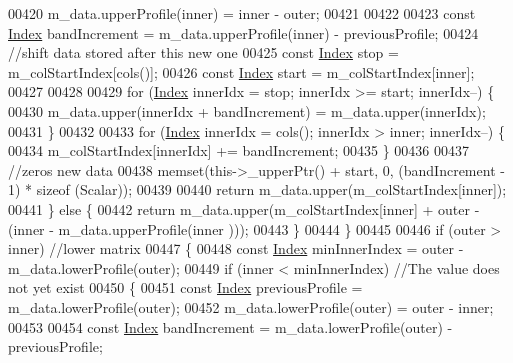 \begin{DoxyCode}
00420                     m\_data.upperProfile(inner) = inner - outer;
00421 
00422 
00423                     \textcolor{keyword}{const} \hyperlink{group___core___module_a554f30542cc2316add4b1ea0a492ff02}{Index} bandIncrement = m\_data.upperProfile(inner) - previousProfile;
00424                     \textcolor{comment}{//shift data stored after this new one}
00425                     \textcolor{keyword}{const} \hyperlink{group___core___module_a554f30542cc2316add4b1ea0a492ff02}{Index} stop = m\_colStartIndex[cols()];
00426                     \textcolor{keyword}{const} \hyperlink{group___core___module_a554f30542cc2316add4b1ea0a492ff02}{Index} start = m\_colStartIndex[inner];
00427 
00428 
00429                     \textcolor{keywordflow}{for} (\hyperlink{group___core___module_a554f30542cc2316add4b1ea0a492ff02}{Index} innerIdx = stop; innerIdx >= start; innerIdx--) \{
00430                         m\_data.upper(innerIdx + bandIncrement) = m\_data.upper(innerIdx);
00431                     \}
00432 
00433                     \textcolor{keywordflow}{for} (\hyperlink{group___core___module_a554f30542cc2316add4b1ea0a492ff02}{Index} innerIdx = cols(); innerIdx > inner; innerIdx--) \{
00434                         m\_colStartIndex[innerIdx] += bandIncrement;
00435                     \}
00436 
00437                     \textcolor{comment}{//zeros new data}
00438                     memset(this->\_upperPtr() + start, 0, (bandIncrement - 1) * \textcolor{keyword}{sizeof} (Scalar));
00439 
00440                     \textcolor{keywordflow}{return} m\_data.upper(m\_colStartIndex[inner]);
00441                 \} \textcolor{keywordflow}{else} \{
00442                     \textcolor{keywordflow}{return} m\_data.upper(m\_colStartIndex[inner] + outer - (inner - m\_data.upperProfile(inner
      )));
00443                 \}
00444             \}
00445 
00446             \textcolor{keywordflow}{if} (outer > inner) \textcolor{comment}{//lower matrix}
00447             \{
00448                 \textcolor{keyword}{const} \hyperlink{group___core___module_a554f30542cc2316add4b1ea0a492ff02}{Index} minInnerIndex = outer - m\_data.lowerProfile(outer);
00449                 \textcolor{keywordflow}{if} (inner < minInnerIndex) \textcolor{comment}{//The value does not yet exist}
00450                 \{
00451                     \textcolor{keyword}{const} \hyperlink{group___core___module_a554f30542cc2316add4b1ea0a492ff02}{Index} previousProfile = m\_data.lowerProfile(outer);
00452                     m\_data.lowerProfile(outer) = outer - inner;
00453 
00454                     \textcolor{keyword}{const} \hyperlink{group___core___module_a554f30542cc2316add4b1ea0a492ff02}{Index} bandIncrement = m\_data.lowerProfile(outer) - previousProfile;

\end{DoxyCode}
